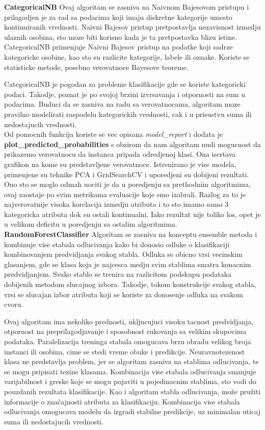 \documentclass[10pt]{article}
\begin{document}
\textbf{CategoricalNB}
Ovaj algoritam se zasniva na Naivnom Bajesovom pristupu i prilagodjen je za rad sa podacima koji imaju diskretne kategorije umesto kontinuiranih vrednosti. Naivni Bajesov pristup pretpostavlja nezavisnost izmedju ulaznih osobina, sto moze biti korisno kada je ta pretpostavka blizu istine. CategoricalNB primenjuje Naivni Bajesov pristup na podatke koji sadrze kategoricke osobine, kao sto su razlicite kategorije, labele ili oznake. Koriste se statisticke metode, posebno verovatnoce Bayesove teoreme.

CategoricalNB je pogodan za probleme klasifikacije gde se koriste kategoricki podaci. Takodje, poznat je po svojoj brzini izvrsavanja i otpornosti na sum u podacima. Buduci da se zasniva na radu sa verovatnocama, algoritam moze pravilno modelirati raspodelu kategorickih vrednosti, cak i u prisustvu suma ili nedostajucih vrednosti.\\

Od pomocnih funkcija koriste se vec opisana \textit{model\_report} i dodata je \\\textbf{plot\_predicted\_probabilities} s obzirom da nam algoritam nudi mogucnost da prikazemo verovatnocu da instanca pripada odredjenoj klasi. Ona iscrtava grafikon na kome su predstavljene verovatnoce. Istrenirano je vise modela, primenjene su tehnike PCA i GridSearchCV i uporedjeni su dobijeni rezultati. Ono sto se moglo odmah uociti je da u poredjenju sa prethodnim algoritmima, ovaj zaostaje po svim metrikama evaluacije koje smo izabrali. Razlog za to je najverovatnije visoka korelacija izmedju atributa i to sto imamo samo 3 kategoricka atributa dok su ostali kontinualni. Iako rezultat nije toliko los, opet je u velikom deficitu u poredjenju sa ostalim algoritmima.\\

\textbf{RandomForestClassifier}
Algoritam se zasniva na konceptu ensemble metoda i kombinuje vise stabala odlucivanja kako bi donosio odluke o klasifikaciji kombinovanjem predvidjanja svakog stabla. Odluka se obicno vrsi vecinskim glasanjem, gde se klasa koja je najcesca medju svim stablima smatra konacnim predvidjanjem. Svako stablo se trenira na razlicitom podskupu podataka dobijenih metodom slucajnog izbora. Takodje, tokom konstrukcije svakog stabla, vrsi se slucajan izbor atributa koji se koriste za donosenje odluka na svakom cvoru.

Ovaj algoritam ima nekoliko prednosti, ukljucujuci visoku tacnost predvidjanja, otpornost na preprilagodjavanje i sposobnost rukovanja sa velikim skupovima podataka. Paralelizacija treninga stabala omogucava brzu obradu velikog broja instanci ili osobina, cime se stedi vreme obuke i predikcije. Neuravnotezenost klasa ne predstavlja problem, jer se algoritam zasniva na stablima odlucivanja, te se mogu pripisati tezine klasama. Kombinacija vise stabala odlucivanja smanjuje varijabilnost i greske koje se mogu pojaviti u pojedinacnim stablima, sto vodi do pouzdanih rezultata klasifikacije. Kao i algoritam stabla odlucivanja, može pružiti informacije o značajnosti atributa za klasifikaciju. Kombinacija vise stabala odlucivanja omogucava modelu da izgradi stabilne predikcije, uz minimalan uticaj suma ili nedostajucih vrednosti.\\
\end{document}
